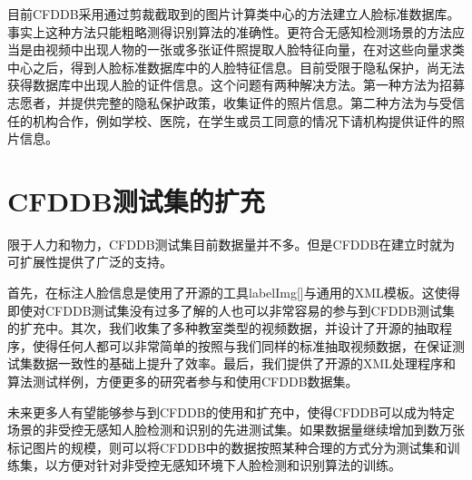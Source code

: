 目前CFDDB采用通过剪裁截取到的图片计算类中心的方法建立人脸标准数据库。事实上这种方法只能粗略测得识别算法的准确性。更符合无感知检测场景的方法应当是由视频中出现人物的一张或多张证件照提取人脸特征向量，在对这些向量求类中心之后，得到人脸标准数据库中的人脸特征信息。目前受限于隐私保护，尚无法获得数据库中出现人脸的证件信息。这个问题有两种解决方法。第一种方法为招募志愿者，并提供完整的隐私保护政策，收集证件的照片信息。第二种方法为与受信任的机构合作，例如学校、医院，在学生或员工同意的情况下请机构提供证件的照片信息。

\section{CFDDB测试集的扩充}

限于人力和物力，CFDDB测试集目前数据量并不多。但是CFDDB在建立时就为可扩展性提供了广泛的支持。

首先，在标注人脸信息是使用了开源的工具labelImg[]与通用的XML模板。这使得即使对CFDDB测试集没有过多了解的人也可以非常容易的参与到CFDDB测试集的扩充中。其次，我们收集了多种教室类型的视频数据，并设计了开源的抽取程序，使得任何人都可以非常简单的按照与我们同样的标准抽取视频数据，在保证测试集数据一致性的基础上提升了效率。最后，我们提供了开源的XML处理程序和算法测试样例，方便更多的研究者参与和使用CFDDB数据集。

未来更多人有望能够参与到CFDDB的使用和扩充中，使得CFDDB可以成为特定场景的非受控无感知人脸检测和识别的先进测试集。如果数据量继续增加到数万张标记图片的规模，则可以将CFDDB中的数据按照某种合理的方式分为测试集和训练集，以方便对针对非受控无感知环境下人脸检测和识别算法的训练。
